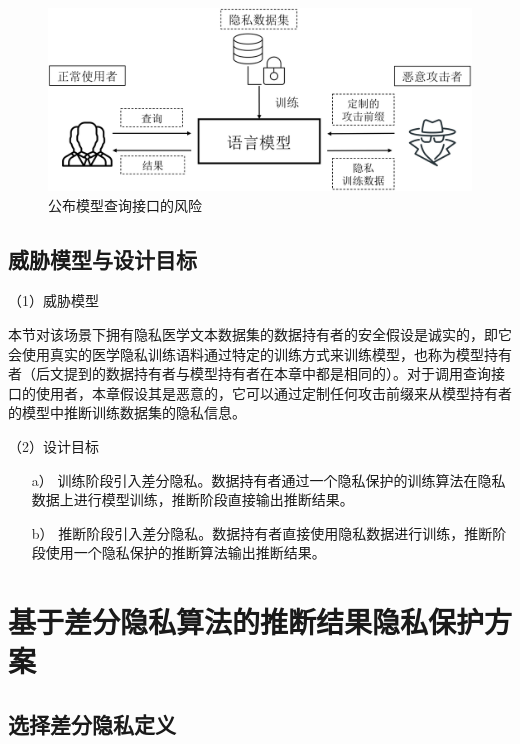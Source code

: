 \begin{figure}[h]
	\centering
	\includegraphics[width=0.7\linewidth]{figures/Chap5_Attack_Model.png}
	\caption{公布模型查询接口的风险}
	\label{Chap5_Attatck_Model}
\end{figure}

\subsection{威胁模型与设计目标}

（1）威胁模型

本节对该场景下拥有隐私医学文本数据集的数据持有者的安全假设是诚实的，即它会使用真实的医学隐私训练语料通过特定的训练方式来训练模型，也称为模型持有者（后文提到的数据持有者与模型持有者在本章中都是相同的）。对于调用查询接口的使用者，本章假设其是恶意的，它可以通过定制任何攻击前缀来从模型持有者的模型中推断训练数据集的隐私信息。

（2）设计目标

\begin{itemize}
	\item [a）]
	训练阶段引入差分隐私。数据持有者通过一个隐私保护的训练算法在隐私数据上进行模型训练，推断阶段直接输出推断结果。
	\item [b）]
	推断阶段引入差分隐私。数据持有者直接使用隐私数据进行训练，推断阶段使用一个隐私保护的推断算法输出推断结果。
\end{itemize}


\section{基于差分隐私算法的推断结果隐私保护方案}

\subsection{选择差分隐私定义}

